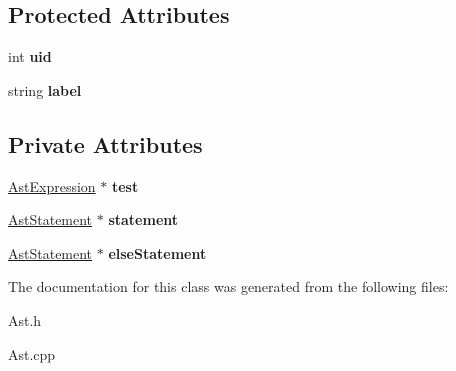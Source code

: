 \subsection*{Protected Attributes}
\begin{DoxyCompactItemize}
\item 
\hypertarget{classAST_a847b778f1c3dd5a19de32de432ee6e15}{int {\bfseries uid}}\label{classAST_a847b778f1c3dd5a19de32de432ee6e15}

\item 
\hypertarget{classAST_ab2e239ccc0688d2341724432ff5a1a31}{string {\bfseries label}}\label{classAST_ab2e239ccc0688d2341724432ff5a1a31}

\end{DoxyCompactItemize}
\subsection*{Private Attributes}
\begin{DoxyCompactItemize}
\item 
\hypertarget{classAstIfElse_a8ee373b9a53acbc71387f948beb335a7}{\hyperlink{classAstExpression}{Ast\-Expression} $\ast$ {\bfseries test}}\label{classAstIfElse_a8ee373b9a53acbc71387f948beb335a7}

\item 
\hypertarget{classAstIfElse_ab9af93616039b05a021413df65896f1c}{\hyperlink{classAstStatement}{Ast\-Statement} $\ast$ {\bfseries statement}}\label{classAstIfElse_ab9af93616039b05a021413df65896f1c}

\item 
\hypertarget{classAstIfElse_aa6d9b8e028316ba27da5ad73729f9169}{\hyperlink{classAstStatement}{Ast\-Statement} $\ast$ {\bfseries else\-Statement}}\label{classAstIfElse_aa6d9b8e028316ba27da5ad73729f9169}

\end{DoxyCompactItemize}


The documentation for this class was generated from the following files\-:\begin{DoxyCompactItemize}
\item 
Ast.\-h\item 
Ast.\-cpp\end{DoxyCompactItemize}
